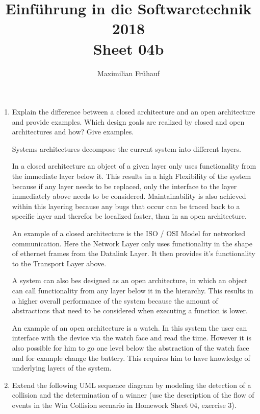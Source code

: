 \documentclass[a4paper, 10pt]{article}
\title{Einführung in die Softwaretechnik 2018 \\ Sheet 04b}
\author{Maximilian Frühauf}
\begin{document}
\maketitle
\begin{enumerate}
    \item 
    Explain the difference between a closed architecture and an open
    architecture and provide examples. Which design goals are realized by closed and
    open architectures and how? Give examples.
    \vspace{0.5cm}

    Systems architectures decompose the current system into different layers. 

    In a closed architecture an object of a  given layer only uses functionality from the immediate layer below it.
    This results in a high Flexibility of the system because if any layer needs to be replaced,
    only the interface to the layer immediately above needs to be considered. 
    Maintainability is also achieved within this layering because any bugs that occur can be traced back
    to a specific layer and therefor be localized faster, than in an open architecture.

    An example of a closed architecture is the ISO / OSI Model for networked communication. 
    Here the Network Layer only uses functionality in the shape of ethernet frames from the Datalink Layer.
    It then provides it's functionality to the Transport Layer above. 
    \vspace{0.5cm}

    A system can also bes designed as an open architecture, in which an object can call functionality from any
    layer below it in the hierarchy. 
    This results in a higher overall performance of the system because the amount of abstractions 
    that need to be considered when executing a function is lower.

    An example of an open architecture is a watch. In this system the user can interface with the device
    via the watch face and read the time. However it is also possible for him to go one level below the abstraction
    of the watch face and for example change the battery. This requires him to have knowledge of underlying layers 
    of the system.

    \item
    Extend the following UML sequence diagram by modeling the detection of a
    collision and the determination of a winner (use the description of the flow of events in
    the Win Collision scenario in Homework Sheet 04, exercise 3).
    \vspace{0.5cm}


\end{enumerate}
\end{document}

